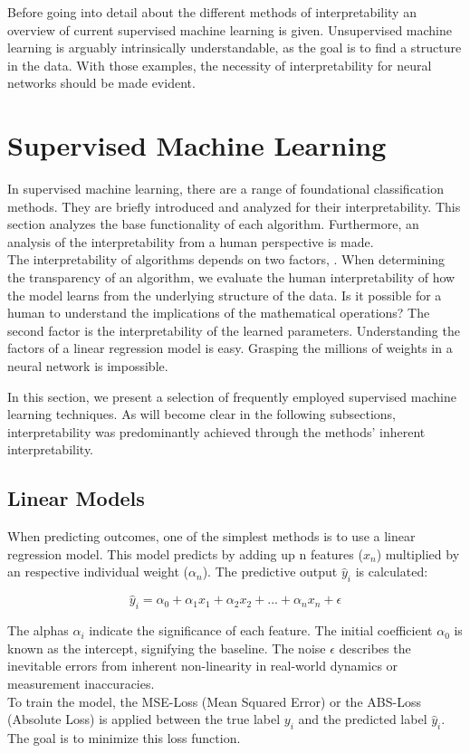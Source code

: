 Before going into detail about the different methods of interpretability an overview of current supervised machine learning is given. Unsupervised machine learning is arguably intrinsically understandable, as the goal is to find a structure in the data. \cite{allen2023interpretable} With those examples, the necessity of interpretability for neural networks should be made evident.

\section{Supervised Machine Learning}

In supervised machine learning, there are a range of foundational classification methods. They are briefly introduced and analyzed for their interpretability. This section analyzes the base functionality of each algorithm. Furthermore, an analysis of the interpretability from a human perspective is made.
\\
The interpretability of algorithms depends on two factors, \cite{molnar2022}. When determining the transparency of an algorithm, we evaluate the human interpretability of how the model learns from the underlying structure of the data. Is it possible for a human to understand the implications of the mathematical operations? The second factor is the interpretability of the learned parameters. Understanding the factors of a linear regression model is easy. Grasping the millions of weights in a neural network is impossible.

In this section, we present a selection of frequently employed supervised machine learning techniques. As will become clear in the following subsections, interpretability was predominantly achieved through the methods' inherent interpretability.

\subsection{Linear Models}

When predicting outcomes, one of the simplest methods is to use a linear regression model. This model predicts by adding up n features ($x_n$) multiplied by an respective individual weight ($\alpha_n$). The predictive output $\hat{y}_i$ is calculated:

$$ \hat{y}_i= \alpha_0 + \alpha_1 x_1 + \alpha_2 x_2 +... +\alpha_n x_{n} + \epsilon$$

The alphas $\alpha_i$ indicate the significance of each feature. The initial coefficient $\alpha_0$ is known as the intercept, signifying the baseline. The noise $\epsilon$ describes the inevitable errors from inherent non-linearity in real-world dynamics or measurement inaccuracies.
\\
To train the model, the MSE-Loss (Mean Squared Error) or the ABS-Loss (Absolute Loss) is applied between the true label $y_i$ and the predicted label $\hat{y}_i$. The goal is to minimize this loss function. 

